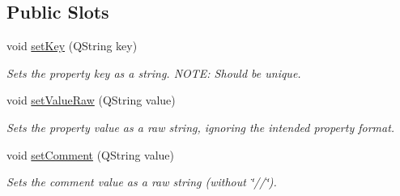 \subsection*{Public Slots}
\begin{DoxyCompactItemize}
\item 
void \hyperlink{class_w_base_property_a8f799b2109e340ce459c34d3fba5ad7a}{set\-Key} (Q\-String key)
\begin{DoxyCompactList}\small\item\em Sets the property key as a string. N\-O\-T\-E\-: Should be unique. \end{DoxyCompactList}\item 
void \hyperlink{class_w_base_property_a43fcf4605167b151729d051d37f3fd1d}{set\-Value\-Raw} (Q\-String value)
\begin{DoxyCompactList}\small\item\em Sets the property value as a raw string, ignoring the intended property format. \end{DoxyCompactList}\item 
void \hyperlink{class_w_base_property_ac3512628c101c5ba985eeae43d13521e}{set\-Comment} (Q\-String value)
\begin{DoxyCompactList}\small\item\em Sets the comment value as a raw string (without \char`\"{}//\char`\"{}). \end{DoxyCompactList}\end{DoxyCompactItemize}
